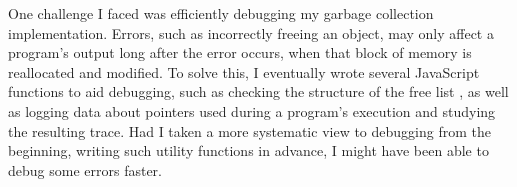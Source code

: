 



%



One challenge I faced was efficiently debugging my garbage collection implementation.
Errors, such as incorrectly freeing an object, may only affect a program's output long after the error occurs, when that block of memory is reallocated and modified. To solve this, I eventually wrote several JavaScript functions to aid debugging, such as checking the structure of the free list%
, as well as logging data about pointers used during a program's execution and studying the resulting trace. 
Had I taken a more systematic view to debugging from the beginning, writing such utility functions in advance, I might have been able to debug some errors faster.

